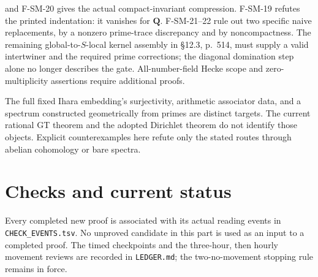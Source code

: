 \begin{description}[style=nextline,leftmargin=0pt]
and F-SM-20 gives the actual compact-invariant compression. F-SM-19
refutes the printed indentation: it vanishes for $\mathbf Q$.
F-SM-21--22 rule out two specific naive replacements, by a nonzero
prime-trace discrepancy and by noncompactness. The remaining
global-to-$S$-local kernel assembly in \S12.3, p.~514, must supply
a valid intertwiner and the required prime corrections; the
diagonal domination step alone no longer describes the gate. All-number-field Hecke scope and
zero-multiplicity assertions require additional proofs.
\item[Profinite GT, anabelian reconstruction and geometric spectra.]
The full fixed Ihara embedding's surjectivity, arithmetic associator
data, and a spectrum constructed geometrically from primes are distinct
targets. The current rational GT theorem and the adopted Dirichlet
theorem do not identify those objects. Explicit counterexamples here
refute only the stated routes through abelian cohomology or bare spectra.
\end{description}

\section{Checks and current status}
Every completed new proof is associated with its actual reading events
in \texttt{CHECK\_EVENTS.tsv}. No unproved candidate in this part is
used as an input to a completed proof. The timed checkpoints and the
three-hour, then hourly movement reviews are recorded in
\texttt{LEDGER.md}; the two-no-movement stopping rule remains in force.
